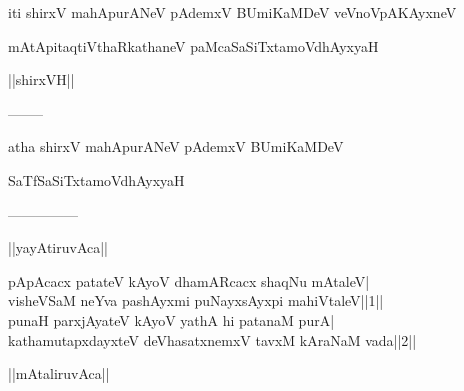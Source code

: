 \documentclass{article}
\begin{document}
\begin{center}
iti shirxV mahApurANeV pAdemxV BUmiKaMDeV veVnoVpAKAyxneV
\end{center}

\begin{center}
mAtApitaqtiVthaRkathaneV paMcaSaSiTxtamoVdhAyxyaH
\end{center}

\begin{center}
||shirxVH||
\end{center}

\begin{center}
--------
\end{center}

\begin{center}
atha shirxV mahApurANeV pAdemxV BUmiKaMDeV
\end{center}

\begin{center}
SaTfSaSiTxtamoVdhAyxyaH
\end{center}

\begin{center}

---------------
\end{center}

\begin{center}
||yayAtiruvAca||
\end{center}

pApAcacx patateV kAyoV dhamARcacx shaqNu mAtaleV|\\
visheVSaM neYva pashAyxmi puNayxsAyxpi mahiVtaleV||1||\\
punaH parxjAyateV kAyoV yathA hi patanaM purA|\\
kathamutapxdayxteV deVhasatxnemxV tavxM kAraNaM vada||2||\\

\begin{center}
||mAtaliruvAca||
\end{center}
\end{document}
